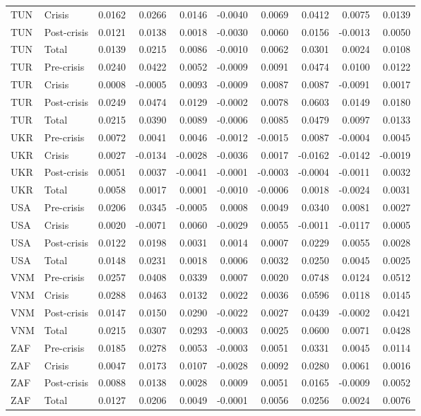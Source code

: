 \begin{longtable}[t]{llrrrrrrrr}
TUN & Crisis & 0.0162 & 0.0266 & 0.0146 & -0.0040 & 0.0069 & 0.0412 & 0.0075 & 0.0139\\
TUN & Post-crisis & 0.0121 & 0.0138 & 0.0018 & -0.0030 & 0.0060 & 0.0156 & -0.0013 & 0.0050\\
TUN & Total & 0.0139 & 0.0215 & 0.0086 & -0.0010 & 0.0062 & 0.0301 & 0.0024 & 0.0108\\
\addlinespace
TUR & Pre-crisis & 0.0240 & 0.0422 & 0.0052 & -0.0009 & 0.0091 & 0.0474 & 0.0100 & 0.0122\\
TUR & Crisis & 0.0008 & -0.0005 & 0.0093 & -0.0009 & 0.0087 & 0.0087 & -0.0091 & 0.0017\\
TUR & Post-crisis & 0.0249 & 0.0474 & 0.0129 & -0.0002 & 0.0078 & 0.0603 & 0.0149 & 0.0180\\
TUR & Total & 0.0215 & 0.0390 & 0.0089 & -0.0006 & 0.0085 & 0.0479 & 0.0097 & 0.0133\\
UKR & Pre-crisis & 0.0072 & 0.0041 & 0.0046 & -0.0012 & -0.0015 & 0.0087 & -0.0004 & 0.0045\\
\addlinespace
UKR & Crisis & 0.0027 & -0.0134 & -0.0028 & -0.0036 & 0.0017 & -0.0162 & -0.0142 & -0.0019\\
UKR & Post-crisis & 0.0051 & 0.0037 & -0.0041 & -0.0001 & -0.0003 & -0.0004 & -0.0011 & 0.0032\\
UKR & Total & 0.0058 & 0.0017 & 0.0001 & -0.0010 & -0.0006 & 0.0018 & -0.0024 & 0.0031\\
USA & Pre-crisis & 0.0206 & 0.0345 & -0.0005 & 0.0008 & 0.0049 & 0.0340 & 0.0081 & 0.0027\\
USA & Crisis & 0.0020 & -0.0071 & 0.0060 & -0.0029 & 0.0055 & -0.0011 & -0.0117 & 0.0005\\
\addlinespace
USA & Post-crisis & 0.0122 & 0.0198 & 0.0031 & 0.0014 & 0.0007 & 0.0229 & 0.0055 & 0.0028\\
USA & Total & 0.0148 & 0.0231 & 0.0018 & 0.0006 & 0.0032 & 0.0250 & 0.0045 & 0.0025\\
VNM & Pre-crisis & 0.0257 & 0.0408 & 0.0339 & 0.0007 & 0.0020 & 0.0748 & 0.0124 & 0.0512\\
VNM & Crisis & 0.0288 & 0.0463 & 0.0132 & 0.0022 & 0.0036 & 0.0596 & 0.0118 & 0.0145\\
VNM & Post-crisis & 0.0147 & 0.0150 & 0.0290 & -0.0022 & 0.0027 & 0.0439 & -0.0002 & 0.0421\\
\addlinespace
VNM & Total & 0.0215 & 0.0307 & 0.0293 & -0.0003 & 0.0025 & 0.0600 & 0.0071 & 0.0428\\
ZAF & Pre-crisis & 0.0185 & 0.0278 & 0.0053 & -0.0003 & 0.0051 & 0.0331 & 0.0045 & 0.0114\\
ZAF & Crisis & 0.0047 & 0.0173 & 0.0107 & -0.0028 & 0.0092 & 0.0280 & 0.0061 & 0.0016\\
ZAF & Post-crisis & 0.0088 & 0.0138 & 0.0028 & 0.0009 & 0.0051 & 0.0165 & -0.0009 & 0.0052\\
ZAF & Total & 0.0127 & 0.0206 & 0.0049 & -0.0001 & 0.0056 & 0.0256 & 0.0024 & 0.0076\\
\bottomrule
\end{longtable}
